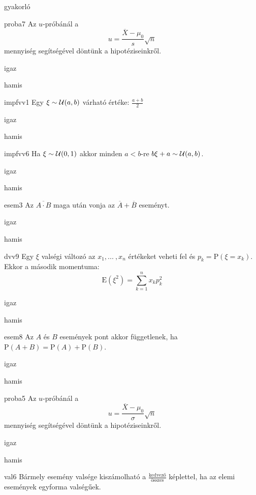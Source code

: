 \documentclass[12pt]{article}
\begin{document}
\begin{quiz}{gyakorló}
\begin{multi}[feedback={A fenti formula az $t$-próba ún. próbastatisztikája.}]{proba7}
Az $u$-próbánál a 
$$
u=\frac{\overline{X}-\mu_0}{s}\sqrt{n}
$$
mennyiség segítségével döntünk a hipotéziseinkről.
\item igaz
\item* hamis
\end{multi}
\begin{multi}[feedback={wiki}]{impfvv1}
Egy $\xi\sim {\cal U}(a,b)$ várható értéke: $\frac{a+b}{2}$
\item* igaz
\item hamis
\end{multi}
\begin{multi}[feedback={$b\xi+a \sim {\cal U}(a,a+b)$}]{impfvv6}
Ha $\xi\sim {\cal U}(0,1)$ akkor  minden $a<b$-re $b\xi+a\sim {\cal U}(a,b)$.
\item igaz
\item* hamis
\end{multi}
\begin{multi}[feedback={de-Morgan azonosság}]{esem3}
Az $\overline{A\cdot B}$ maga után vonja az $\overline{A} + \overline{B}$ eseményt.
\item* igaz
\item hamis
\end{multi}
\begin{multi}[feedback={Def.}]{dvv9}
Egy $\xi$ valségi változó az $x_1,{...\:}, x_n$ értékeket veheti fel és $p_k=\mathrm{P}(\xi=x_k)$. 
Ekkor a második momentuma:
$$
\mathrm{E}(\xi^2)=\sum_{k=1}^n x_k p_k^2
$$
\item igaz
\item* hamis
\end{multi}
\begin{multi}[feedback={Definíció.}]{esem8}
Az $A$ és $B$ események pont akkor függetlenek, ha $\mathrm{P}(A+B)=\mathrm{P}(A)+\mathrm{P}(B)$.
\item igaz
\item* hamis
\end{multi}
\begin{multi}[feedback={A fenti formula az $u$-próba ún. próbastatisztikája.}]{proba5}
Az $u$-próbánál a 
$$
u=\frac{\overline{X}-\mu_0}{\sigma}\sqrt{n}
$$
mennyiség segítségével döntünk a hipotéziseinkről.
\item* igaz
\item hamis
\end{multi}
\begin{multi}[feedback={Additívitás.}]{val6}
Bármely esemény valsége kiszámolható a $\frac{\text{kedvező}}{\text{összes}}$ képlettel, ha az elemi események 
egyforma valségűek.

\end{multi}
\end{quiz}
\end{document}
